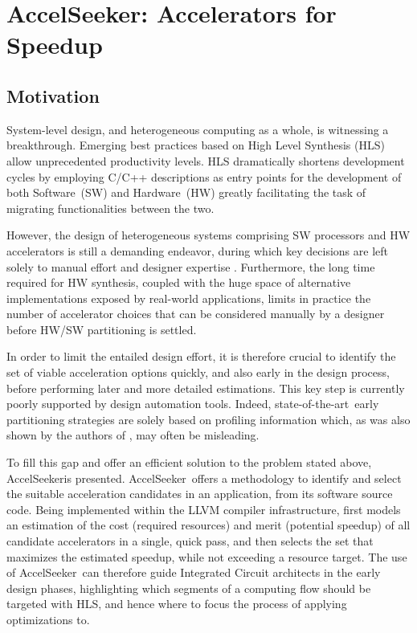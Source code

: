 \documentclass[]{usiinfthesis}
\newcommand{\aseeker}{{AccelSeeker}}
\newcommand{\HW}{{Hardware}}
\newcommand{\SW}{{Software}}
\newcommand{\SoTA}{{state-of-the-art}}
\begin{document}
% 
%
%
%
%

\section{\aseeker: Accelerators for Speedup}

\subsection{Motivation}

System-level design, and heterogeneous computing as a whole, is witnessing a breakthrough. 
Emerging best practices based on High Level Synthesis (HLS) allow unprecedented productivity levels. 
HLS dramatically shortens development cycles by employing C/C++ descriptions as entry points 
for the development of both \SW\ (SW) and \HW\ (HW) greatly facilitating the task of migrating 
functionalities between the two.\par

However, the design of heterogeneous systems comprising SW processors and HW accelerators is 
still a demanding endeavor, during which key decisions are left solely to manual effort and 
designer expertise \cite{CacciottiSep18} \cite{NouriJun17}. Furthermore, the long time required 
for HW synthesis, coupled with the huge space of alternative implementations exposed by real-world 
applications, limits in practice the number of accelerator choices that can be considered manually 
by a designer before HW/SW partitioning is settled.\par

In order to limit the entailed design effort, it is therefore crucial to identify the set of viable 
acceleration options quickly, and also early in the design process, before performing later and more 
detailed estimations. This key step is currently poorly supported by design automation tools. Indeed, 
\SoTA\ early partitioning strategies are solely based on profiling information \cite{XilinxESTRef18} 
\cite{LattnerMar04} which, as was also shown by the authors of \cite{SyrowikJun18}, may often be 
misleading.\par

To fill this gap and offer an efficient solution to the problem stated above, \aseeker is presented. 
\aseeker\ offers a methodology to identify and select the suitable acceleration candidates in an
application, from its software source code. Being implemented within the LLVM \cite{LattnerMar04} compiler 
infrastructure, first models an estimation of the cost (required resources) and merit (potential speedup) 
of all candidate accelerators in a single, quick pass, and then selects the set that maximizes the estimated 
speedup, while not exceeding a resource target. The use of \aseeker\ can therefore guide Integrated Circuit 
architects in the early design phases, highlighting which segments of a computing flow should be
targeted with HLS, and hence where to focus the process of applying optimizations to.\par
\end{document}
